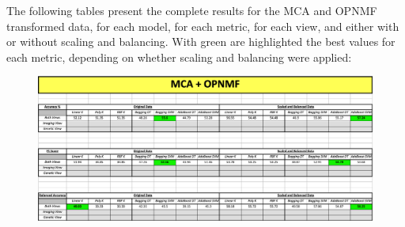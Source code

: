 {%

The following tables present the complete results for the MCA and OPNMF transformed data, for each model, for each metric, for each view, and either with or without scaling and balancing. With green are highlighted the best values for each metric, depending on whether scaling and balancing were applied:

\begin{figure} [H]
    \centering
    \includegraphics[width=\textwidth]{figures/Results/Analytical_Table_MCA_OPNMF.png}
    \caption[]{}
    \label{fig: Summary Table for classification scores for MCA - OPNMF transformed data}
\end{figure}
}